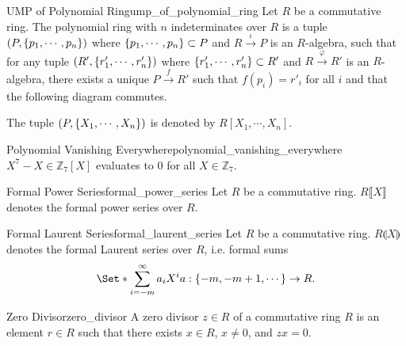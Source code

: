 \documentclass{article}
\begin{document}
\begin{proposition}{UMP of Polynomial Ring}{ump_of_polynomial_ring}
    Let $R$ be a commutative ring.
    The polynomial ring with $n$ indeterminates over $R$ is a tuple $(P,\qty{p_1,\cdots,p_n})$ where $\qty{p_1,\cdots,p_n}\subset P$ and $R\xrightarrow{\iota} P$ is an $R$-algebra,
    such that for any tuple $(R',\qty{r'_1,\cdots,r'_n})$ where $\qty{r'_1,\cdots,r'_n}\subset R'$ and $R\xrightarrow{\varphi} R'$ is an $R$-algebra, there exists a unique $P\xrightarrow{f} R'$ such that $f(p_i) = r'_i$ for all $i$ and that the following diagram commutes.
    \begin{center}
    \end{center}
    The tuple $(P,\qty{X_1,\cdots,X_n})$ is denoted by $R[X_1,\cdots,X_n]$.
\end{proposition}

\begin{example}{Polynomial Vanishing Everywhere}{polynomial_vanishing_everywhere}
    $X^7-X\in \mathbb{Z}_7[X]$ evaluates to $0$ for all $X\in \mathbb{Z}_7$.
\end{example}

\begin{definition}{Formal Power Series}{formal_power_series}
    Let $R$ be a commutative ring.
    $R\llbracket X \rrbracket$ denotes the formal power series over $R$.
\end{definition}

\begin{definition}{Formal Laurent Series}{formal_laurent_series}
    Let $R$ be a commutative ring.
    $R\llparenthesis X \rrparenthesis$ denotes the formal Laurent series over $R$, i.e. formal sums
    \[ \Set*{\sum_{i=-m}^\infty a_i X^i}{a:\qty{-m,-m+1,\cdots}\rightarrow R}. \]
\end{definition}

\begin{definition}{Zero Divisor}{zero_divisor}
    A zero divisor $z\in R$ of a commutative ring $R$ is an element $r\in R$ such that there exists $x\in R$, $x\neq 0$, and $zx=0$.
\end{definition}
\end{document}
